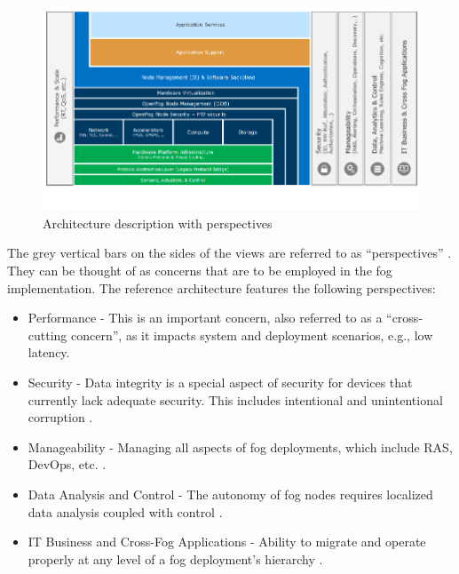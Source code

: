 \documentclass{article}
\begin{document}
\begin{figure}[H]
	\centering
	\includegraphics[scale=0.5]{figa.png}
	\caption{Architecture description with perspectives \cite{openfogconsortium2017}}
	\label{fig:openfog_ra}
\end{figure} 

The grey vertical bars on the sides of the views are referred to as ``perspectives'' \cite{openfogconsortium2017}. They can be thought of as concerns that are to be employed in the fog implementation. The reference architecture features the following perspectives:

\begin{itemize}
\item Performance - This is an important concern, also referred to as a ``cross-cutting concern'', as it impacts system and deployment scenarios, e.g., low latency.

\item Security - Data integrity is a special aspect of security for devices that currently lack adequate security. This includes intentional and unintentional corruption \cite{openfogconsortium2017}.

\item Manageability - Managing all aspects of fog deployments, which include RAS, DevOps, etc. \cite{openfogconsortium2017}. 

\item Data Analysis and Control -  The autonomy of fog nodes requires localized data analysis coupled with control \cite{openfogconsortium2017}.

\item IT Business and Cross-Fog Applications - Ability to migrate and operate properly at any level of a fog deployment’s hierarchy \cite{openfogconsortium2017}.  
\end{itemize}
\end{document}
